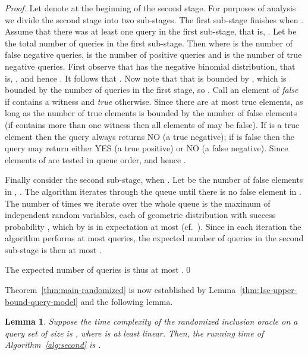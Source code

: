 \documentclass[11pt]{article}
\newtheorem{lemma}[theorem]{Lemma}
\begin{document}
\begin{proof}
Let  denote  at the beginning of the second stage. 
For purposes of analysis we divide the second stage into 
two sub-stages. The first sub-stage finishes when . 
Assume that there was at least one query in the first sub-stage, 
that is, .
Let  be the total number of queries in the first sub-stage.
Then  where  is the number of false negative queries, 
 is the number of positive queries and  is the number of true 
negative queries. First observe that  has the negative binomial 
distribution, that is, , 
and hence . 
It follows that .
Now note that that  is bounded by , which is bounded by 
the number of queries in the first stage, so . 
Call an element  of  {\em false} if  contains 
a witness and {\em true} otherwise. Since there are at most 
 true elements, as long as  the number of true elements is 
bounded by the number of false elements (if  contains more than 
one witness then all elements of  may be false). 
If  is a true element then the query  
always returns NO (a true negative); if  is false then 
the query  may return either YES (a true positive)
or NO (a false negative). 
Since elements of  are tested in queue order,  
and hence .

Finally consider the second sub-stage, when . 
Let  be the number of false elements in , .
The algorithm iterates through the queue until there is no false element 
in . The number of times we iterate over the whole queue is the maximum 
of  independent random variables, each of geometric distribution 
with success probability , which by  is in expectation 
at most  
(cf.~\cite{Eisenberg2008}). Since in each iteration the algorithm 
performs at most  queries, the expected number of queries in the second 
sub-stage is then at most .

The expected number of queries is thus at most .\qed 
\end{proof}

Theorem~\ref{thm:main-randomized} is now established by
Lemma~\ref{thm:1se-upper-bound-query-model} and the following lemma.

\begin{lemma}
\label{lem:randomized-extract-runtime}
Suppose the time complexity of the randomized inclusion oracle on a query set of size  
is , where  is at least linear.
Then, the running time of Algorithm~\ref{alg:second}
is .
\end{lemma}
\end{document}
